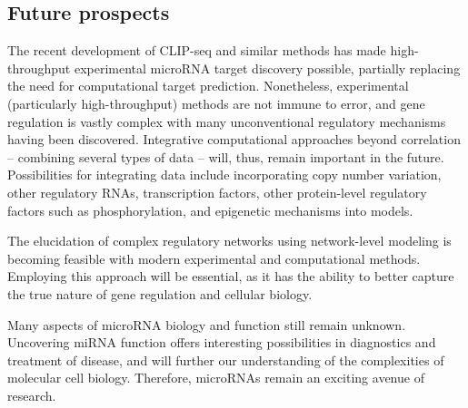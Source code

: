 \subsection*{Future prospects}

The recent development of CLIP-seq and similar methods has made high-throughput
experimental microRNA target discovery possible, partially
replacing the need for computational target prediction. Nonetheless,
experimental (particularly high-throughput) methods are not immune to error,
and gene regulation is vastly complex with many unconventional regulatory
mechanisms having been discovered. Integrative computational approaches
beyond correlation -- combining several types of data -- will, thus,
remain important in the future. Possibilities for integrating data include
incorporating copy number variation, other regulatory RNAs, transcription factors,
other protein-level regulatory factors such as phosphorylation, and
epigenetic mechanisms into models.

The elucidation of complex regulatory networks using network-level modeling is
becoming feasible with modern experimental and computational methods.
Employing this approach will be essential, as it has the ability to better
capture the true nature of gene regulation and cellular biology.

Many aspects of microRNA biology and function still remain unknown. Uncovering
miRNA function offers interesting possibilities in diagnostics and treatment
of disease, and will further our understanding of the complexities of
molecular cell biology. Therefore, microRNAs remain an exciting avenue
of research.
